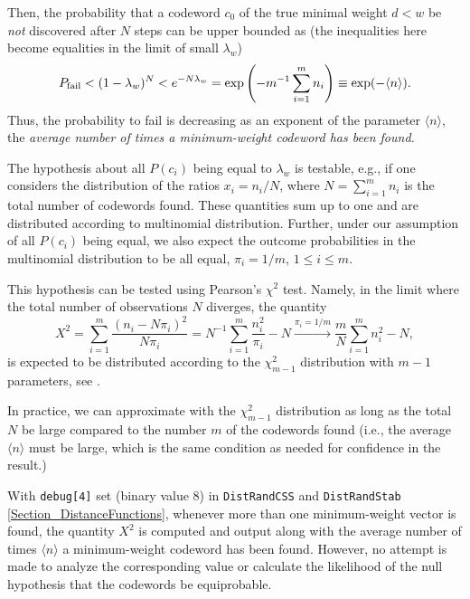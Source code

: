 \documentclass[a4paper,11pt]{report}
\begin{document}
{{ Then, the probability that a codeword $c_0$ of the true minimal weight $ d < w $ be \emph{not} discovered after $N$ steps can be upper bounded as (the inequalities here become equalities in the
limit of small $\lambda_w$) 
\[ P_{\rm fail} < (1-\lambda_w)^N < e^{-N\lambda_w}=\exp\left(-m^{-1}\sum_{i=1}^m
n_i\right)\equiv \exp(-\langle n\rangle). \]
 Thus, the probability to fail is decreasing as an exponent of the parameter $\langle n\rangle$, the \emph{average number of times a minimum-weight codeword has been found.} 

 The hypothesis about all $P(c_i)$ being equal to $\lambda_w$ is testable, e.g., if one considers the distribution of the ratios $x_i=n_i/N$, where $N=\sum_{i=1}^m n_i$ is the total number of codewords found. These quantities sum up to one and are
distributed according to multinomial distribution\cite{Steel-1953}. Further, under our assumption of all $P(c_i)$ being equal, we also expect the outcome probabilities in the multinomial
distribution to be all equal, $\pi_i=1/m$, $1\le i\le m$. 

 This hypothesis can be tested using Pearson's $\chi^2$ test. Namely, in the limit where the total number of observations $N$ diverges, the quantity 
\[ X^2=\sum_{i=1}^m \frac{(n_i-N \pi_i)^2}{ N\pi_i}= N^{-1}\sum_{i=1}^m
\frac{n_i^2}{\pi_i}-N \stackrel{\pi_i=1/m}\to\frac{m}{N}\sum_{i=1}^m n_i^2-N, \]
 is expected to be distributed according to the $\chi^2_{m-1}$ distribution with $m-1$ parameters, see \cite{Chernoff-Lehmann-1954} \cite{Cramer-book-1999}. 

 In practice, we can approximate with the $\chi^2_{m-1}$ distribution as long as the total $N$ be large compared to the number $m$ of the codewords found (i.e., the average $\langle n\rangle$ must be large, which is the same condition as needed for confidence in the
result.) 

 With \texttt{debug[4]} set (binary value 8) in \texttt{DistRandCSS} and \texttt{DistRandStab} \ref{Section_DistanceFunctions}, whenever more than one minimum-weight vector is found, the quantity $X^2$ is computed and output along with the average number of times $\langle n\rangle$ a minimum-weight codeword has been found. However, no attempt is made to
analyze the corresponding value or calculate the likelihood of the null
hypothesis that the codewords be equiprobable. 

 }

 }

   
\end{document}
